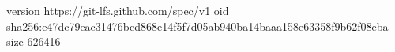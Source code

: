 version https://git-lfs.github.com/spec/v1
oid sha256:e47dc79eac31476bcd868e14f5f7d05ab940ba14baaa158e63358f9b62f08eba
size 626416

